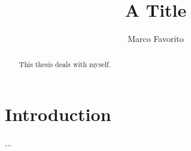 \documentclass[binding=0.6cm,PhD]{sapthesis}
\title{A Title}
\author{Marco Favorito}
\begin{document}
\frontmatter
\maketitle

\begin{abstract}
This thesis deals with myself.
\end{abstract}

\tableofcontents

\mainmatter
\chapter{Introduction}...
\backmatter
\cleardoublepage

\end{document}
